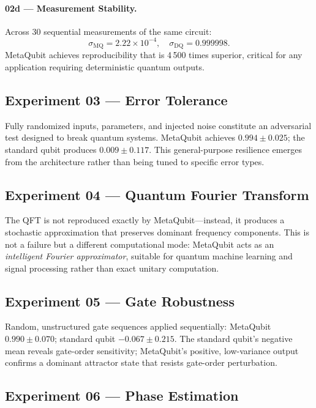 \documentclass[twocolumn,amsmath,amssymb,prl]{revtex4-2}
\begin{document}
\paragraph{02d — Measurement Stability.}
Across 30 sequential measurements of the same circuit:
\begin{equation}
  \sigma_{\mathrm{MQ}} = 2.22 \times 10^{-4}, \quad
  \sigma_{\mathrm{DQ}} = 0.999998.
\end{equation}
MetaQubit achieves reproducibility that is 4\,500 times superior,
critical for any application requiring deterministic quantum outputs.

\subsection{Experiment 03 — Error Tolerance}

Fully randomized inputs, parameters, and injected noise constitute an
adversarial test designed to break quantum systems.  MetaQubit achieves
$0.994 \pm 0.025$; the standard qubit produces $0.009 \pm 0.117$.  This
general-purpose resilience emerges from the architecture rather than being
tuned to specific error types.

\subsection{Experiment 04 — Quantum Fourier Transform}

The QFT is not reproduced exactly by MetaQubit—instead, it produces a
stochastic approximation that preserves dominant frequency components.  This
is not a failure but a different computational mode: MetaQubit acts as an
\emph{intelligent Fourier approximator}, suitable for quantum machine learning
and signal processing rather than exact unitary computation.

\subsection{Experiment 05 — Gate Robustness}

Random, unstructured gate sequences applied sequentially:
MetaQubit $0.990 \pm 0.070$; standard qubit $-0.067 \pm 0.215$.  The
standard qubit's negative mean reveals gate-order sensitivity; MetaQubit's
positive, low-variance output confirms a dominant attractor state that resists
gate-order perturbation.

\subsection{Experiment 06 — Phase Estimation}
\end{document}
